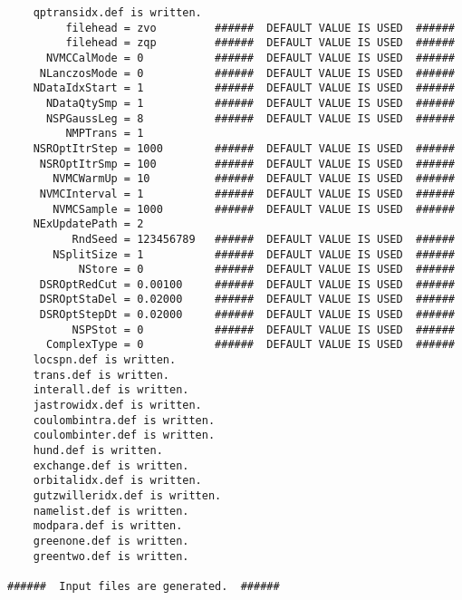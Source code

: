 \begin{verbatim}
    qptransidx.def is written.
         filehead = zvo         ######  DEFAULT VALUE IS USED  ######
         filehead = zqp         ######  DEFAULT VALUE IS USED  ######
      NVMCCalMode = 0           ######  DEFAULT VALUE IS USED  ######
     NLanczosMode = 0           ######  DEFAULT VALUE IS USED  ######
    NDataIdxStart = 1           ######  DEFAULT VALUE IS USED  ######
      NDataQtySmp = 1           ######  DEFAULT VALUE IS USED  ######
      NSPGaussLeg = 8           ######  DEFAULT VALUE IS USED  ######
         NMPTrans = 1         
    NSROptItrStep = 1000        ######  DEFAULT VALUE IS USED  ######
     NSROptItrSmp = 100         ######  DEFAULT VALUE IS USED  ######
       NVMCWarmUp = 10          ######  DEFAULT VALUE IS USED  ######
     NVMCInterval = 1           ######  DEFAULT VALUE IS USED  ######
       NVMCSample = 1000        ######  DEFAULT VALUE IS USED  ######
    NExUpdatePath = 2         
          RndSeed = 123456789   ######  DEFAULT VALUE IS USED  ######
       NSplitSize = 1           ######  DEFAULT VALUE IS USED  ######
           NStore = 0           ######  DEFAULT VALUE IS USED  ######
     DSROptRedCut = 0.00100     ######  DEFAULT VALUE IS USED  ######
     DSROptStaDel = 0.02000     ######  DEFAULT VALUE IS USED  ######
     DSROptStepDt = 0.02000     ######  DEFAULT VALUE IS USED  ######
          NSPStot = 0           ######  DEFAULT VALUE IS USED  ######
      ComplexType = 0           ######  DEFAULT VALUE IS USED  ######
    locspn.def is written.
    trans.def is written.
    interall.def is written.
    jastrowidx.def is written.
    coulombintra.def is written.
    coulombinter.def is written.
    hund.def is written.
    exchange.def is written.
    orbitalidx.def is written.
    gutzwilleridx.def is written.
    namelist.def is written.
    modpara.def is written.
    greenone.def is written.
    greentwo.def is written.

######  Input files are generated.  ######
\end{verbatim}
\normalsize

